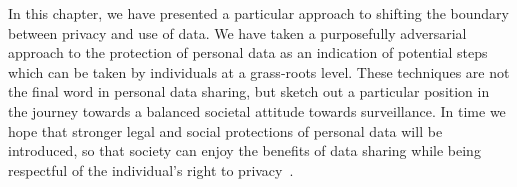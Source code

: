 \documentclass{IOS-Book-Article}     %
\begin{document}
In this chapter, we have presented a particular approach to shifting the
boundary between privacy and use of data. We have taken a purposefully
adversarial approach to the protection of personal data as an indication of
potential steps which can be taken by individuals at a grass-roots level. 
These techniques are not the final word in personal data sharing, but sketch out
a particular position in the journey towards a balanced societal attitude
towards surveillance.
In time we hope that stronger legal and social protections of personal data will be
introduced, so that society can enjoy the benefits of data sharing while being
respectful of the individual's right to 
privacy~\cite{rooney2012OpenData,rauhofer2012FutureProofing}. 






\end{document}
